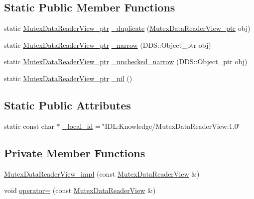 \subsection*{Static Public Member Functions}
\begin{DoxyCompactItemize}
\item 
static \hyperlink{classKnowledge_1_1MutexDataReaderView}{MutexDataReaderView\_\-ptr} \hyperlink{classKnowledge_1_1MutexDataReaderView_aca7755c70e87b7e9a6299d7559839b69}{\_\-duplicate} (\hyperlink{classKnowledge_1_1MutexDataReaderView}{MutexDataReaderView\_\-ptr} obj)
\item 
static \hyperlink{classKnowledge_1_1MutexDataReaderView}{MutexDataReaderView\_\-ptr} \hyperlink{classKnowledge_1_1MutexDataReaderView_adaf351ff071d6efd6dbf2e012993e54c}{\_\-narrow} (DDS::Object\_\-ptr obj)
\item 
static \hyperlink{classKnowledge_1_1MutexDataReaderView}{MutexDataReaderView\_\-ptr} \hyperlink{classKnowledge_1_1MutexDataReaderView_a9a6a050952005aad67d04ef3d5f0b171}{\_\-unchecked\_\-narrow} (DDS::Object\_\-ptr obj)
\item 
static \hyperlink{classKnowledge_1_1MutexDataReaderView}{MutexDataReaderView\_\-ptr} \hyperlink{classKnowledge_1_1MutexDataReaderView_a3218115ef8ecad204d528343f33274ad}{\_\-nil} ()
\end{DoxyCompactItemize}
\subsection*{Static Public Attributes}
\begin{DoxyCompactItemize}
\item 
static const char $\ast$ \hyperlink{classKnowledge_1_1MutexDataReaderView_a807ab0ccc917184fa6f2ab18558fc0d5}{\_\-local\_\-id} = \char`\"{}IDL:Knowledge/MutexDataReaderView:1.0\char`\"{}
\end{DoxyCompactItemize}
\subsection*{Private Member Functions}
\begin{DoxyCompactItemize}
\item 
\hyperlink{classKnowledge_1_1MutexDataReaderView__impl_a391103cdb26de2ce97bacfdcb30c358e}{MutexDataReaderView\_\-impl} (const \hyperlink{classKnowledge_1_1MutexDataReaderView}{MutexDataReaderView} \&)
\item 
void \hyperlink{classKnowledge_1_1MutexDataReaderView__impl_a342f2d6dc787e2bc16580790d89d7d3c}{operator=} (const \hyperlink{classKnowledge_1_1MutexDataReaderView}{MutexDataReaderView} \&)
\end{DoxyCompactItemize}


